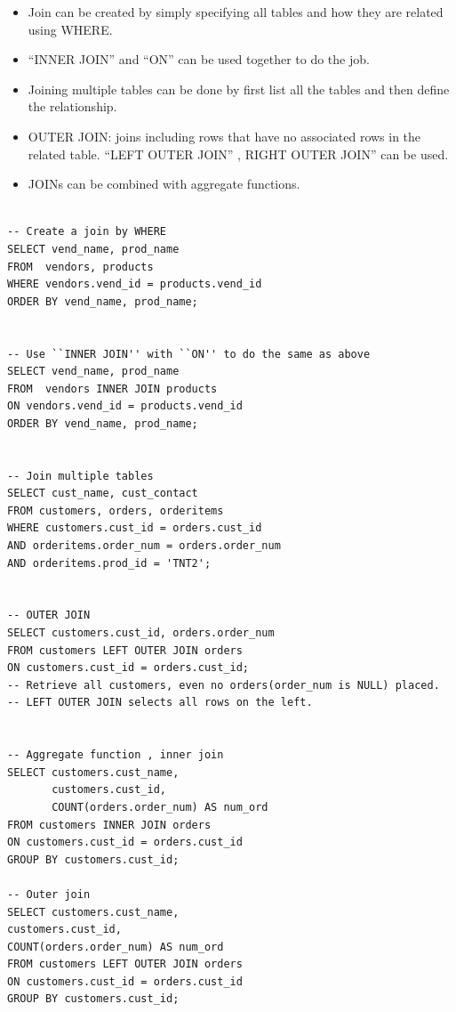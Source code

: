 \documentclass[12pt,oneside,a4paper]{article}
\begin{document}
\begin{itemize}
\item Join can be created by simply specifying all tables and how they are related using \textsf{WHERE}. 

\item ``INNER JOIN'' and  ``ON'' can be used together to do the job. 

\item Joining multiple tables can be done by first list all the tables and then define the relationship. 

\item OUTER JOIN: joins including rows that have no associated rows in the related table. ``LEFT OUTER JOIN'' , RIGHT OUTER JOIN'' can be used. 

\item JOINs can be combined with aggregate functions. 
\end{itemize}
\begin{lstlisting}

-- Create a join by WHERE 
SELECT vend_name, prod_name 
FROM  vendors, products 
WHERE vendors.vend_id = products.vend_id
ORDER BY vend_name, prod_name;


-- Use ``INNER JOIN'' with ``ON'' to do the same as above 
SELECT vend_name, prod_name 
FROM  vendors INNER JOIN products 
ON vendors.vend_id = products.vend_id
ORDER BY vend_name, prod_name;


-- Join multiple tables 
SELECT cust_name, cust_contact
FROM customers, orders, orderitems
WHERE customers.cust_id = orders.cust_id 
AND orderitems.order_num = orders.order_num
AND orderitems.prod_id = 'TNT2';


-- OUTER JOIN 
SELECT customers.cust_id, orders.order_num
FROM customers LEFT OUTER JOIN orders 
ON customers.cust_id = orders.cust_id;
-- Retrieve all customers, even no orders(order_num is NULL) placed.
-- LEFT OUTER JOIN selects all rows on the left. 


-- Aggregate function , inner join 
SELECT customers.cust_name,
       customers.cust_id,
       COUNT(orders.order_num) AS num_ord
FROM customers INNER JOIN orders
ON customers.cust_id = orders.cust_id
GROUP BY customers.cust_id;
       
-- Outer join        
SELECT customers.cust_name,
customers.cust_id,
COUNT(orders.order_num) AS num_ord
FROM customers LEFT OUTER JOIN orders
ON customers.cust_id = orders.cust_id
GROUP BY customers.cust_id;

\end{lstlisting}
\end{document}
